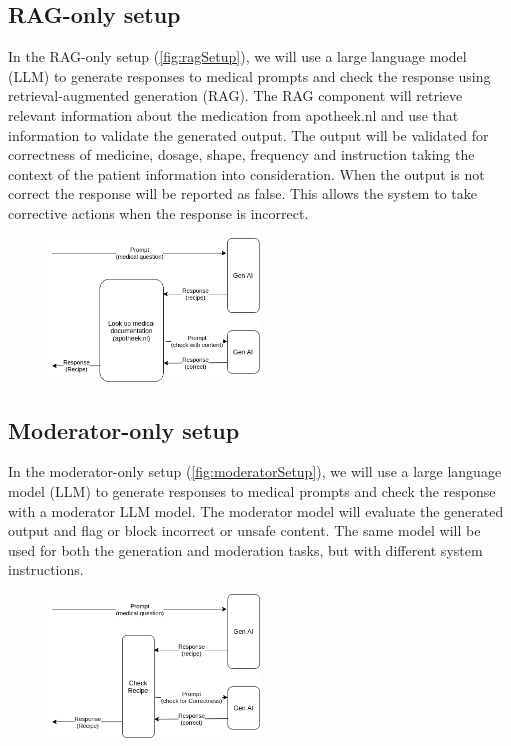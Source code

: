 \subsection{RAG-only setup}

In the RAG-only setup (\autoref{fig:ragSetup}), we will use a large language model (LLM) to generate responses to medical prompts and check the response using retrieval-augmented generation (RAG).
The RAG component will retrieve relevant information about the medication from apotheek.nl and use that information to validate the generated output.
The output will be validated for correctness of medicine, dosage, shape, frequency and instruction taking the context of the patient information into consideration.
When the output is not correct the response will be reported as false.
This allows the system to take corrective actions when the response is incorrect.

\begin{figure}[H]
    \includegraphics[width=0.5\textwidth]{figures/RAGSetup.png}
    \label{fig:ragSetup}
\end{figure}

\subsection{Moderator-only setup}

In the moderator-only setup (\autoref{fig:moderatorSetup}), we will use a large language model (LLM) to generate responses to medical prompts and check the response with a moderator LLM model.
The moderator model will evaluate the generated output and flag or block incorrect or unsafe content.
The same model will be used for both the generation and moderation tasks, but with different system instructions.

\begin{figure}[H]
    \includegraphics[width=0.5\textwidth]{figures/moderatorSetup.png}
    \label{fig:moderatorSetup}
\end{figure}

